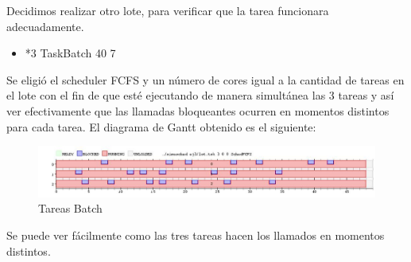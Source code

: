 Decidimos realizar otro lote, para verificar que la tarea funcionara adecuadamente.

\begin{itemize}

\item *3 TaskBatch 40 7

\end{itemize}

Se eligió el scheduler FCFS y un número de cores igual a la cantidad de tareas en el lote con el fin de que esté ejecutando de manera simultánea las 3 tareas y así ver efectivamente que las llamadas bloqueantes ocurren en momentos distintos para cada tarea.
El diagrama de Gantt obtenido es el siguiente:

\begin{figure}[h]
  \includegraphics[width=\textwidth]{../ej3/salida2.png}
  \caption{Tareas Batch}
\end{figure}


Se puede ver fácilmente como las tres tareas hacen los llamados en momentos distintos.
